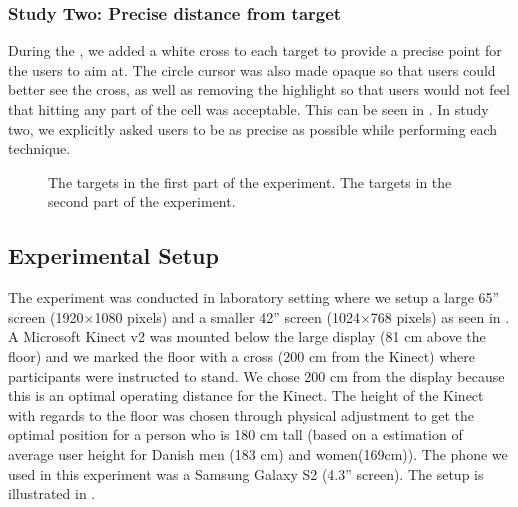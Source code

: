 \subsubsection{Study Two: Precise distance from target}
During the \accuracy, we added a white cross to each target to provide a precise point for the users to aim at.
The circle cursor was also made opaque so that users could better see the cross, as well as removing the highlight so that users would not feel that hitting any part of the cell was acceptable.
This can be seen in .
In study two, we explicitly asked users to be as precise as possible while performing each technique.

\begin{figure}[H]
\centering
{}
\hspace{0.05\columnwidth}
\caption{\protect{} The targets in the first part of the experiment. \protect{} The targets in the second part of the experiment.}
\end{figure}

\subsection{Experimental Setup} \label{sec:setup}
The experiment was conducted in laboratory setting where we setup a large 65'' screen (1920$\times$1080 pixels) and a smaller 42'' screen (1024$\times$768 pixels) as seen in .
A Microsoft Kinect v2 was mounted below the large display (81 cm above the floor) and we marked the floor with a cross (200 cm from the Kinect) where participants were instructed to stand.
We chose 200 cm from the display because this is an optimal operating distance for the Kinect.
The height of the Kinect with regards to the floor was chosen through physical adjustment to get the optimal position for a person who is 180 cm tall (based on a estimation of average user height for Danish men (183 cm) and women(169cm)).
The phone we used in this experiment was a Samsung Galaxy S2 (4.3'' screen).
The setup is illustrated in .

